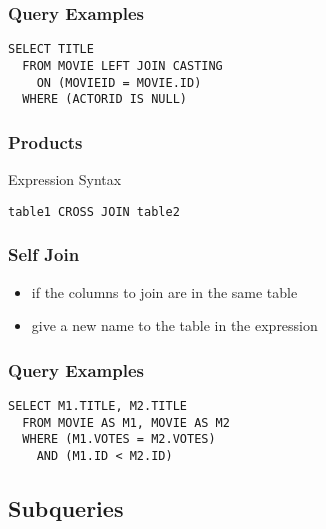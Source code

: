 \documentclass[dvipsnames]{beamer}
\theoremstyle{plain}
\begin{document}
\begin{frame}[fragile]
  \frametitle{Query Examples}

  \begin{example}
    \begin{lstlisting}
SELECT TITLE
  FROM MOVIE LEFT JOIN CASTING
    ON (MOVIEID = MOVIE.ID)
  WHERE (ACTORID IS NULL)
    \end{lstlisting}
  \end{example}
\end{frame}

\begin{frame}[fragile]
  \frametitle{Products}

  \begin{block}{Expression Syntax}
    \begin{lstlisting}
table1 CROSS JOIN table2
    \end{lstlisting}
  \end{block}
\end{frame}

\begin{frame}[fragile]
  \frametitle{Self Join}

  \begin{itemize}
    \item if the columns to join are in the same table
    \item give a new name to the table in the expression
  \end{itemize}
\end{frame}

\begin{frame}[fragile]
  \frametitle{Query Examples}

  \begin{example}
    \lstinline!SELECT M1.TITLE, M2.TITLE!\\
    \lstinline!  FROM MOVIE AS M1, MOVIE AS M2!\\
    \lstinline!  WHERE (M1.VOTES = M2.VOTES)!\\
    \pause
    \lstinline!    AND (M1.ID < M2.ID)!
  \end{example}
\end{frame}

\subsection{Subqueries}
\end{document}
